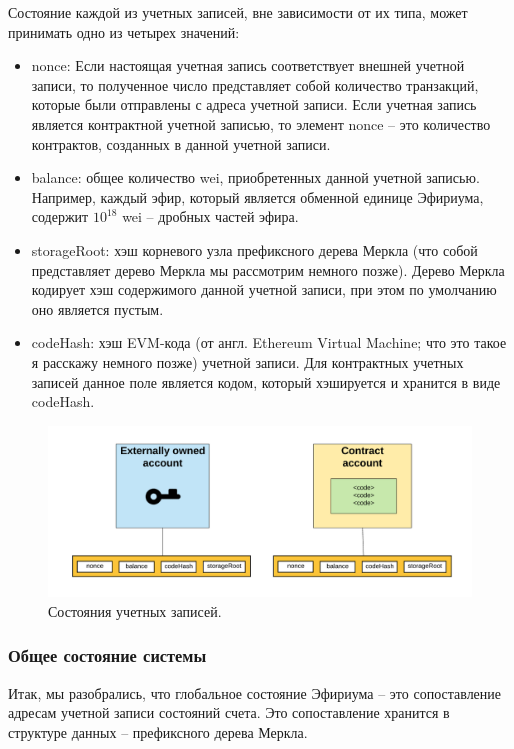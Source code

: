 \documentclass{article}
\begin{document}
Состояние каждой из учетных записей, вне зависимости от их типа, может принимать одно из четырех значений: 

\begin{itemize}
 \item nonce: Если настоящая учетная запись соответствует внешней учетной записи, то полученное число представляет собой количество транзакций, которые были отправлены с адреса учетной записи. Если учетная запись является контрактной учетной записью, то элемент nonce – это количество контрактов, созданных в данной учетной записи.
 \item balance: общее количество wei, приобретенных данной учетной записью. Например, каждый эфир, который является обменной единице Эфириума, содержит $10^{18}$ wei – дробных частей эфира.
 \item storageRoot: хэш корневого узла префиксного дерева Меркла (что собой представляет дерево Меркла мы рассмотрим немного позже). Дерево Меркла кодирует хэш содержимого данной учетной записи, при этом по умолчанию оно является пустым.
 \item codeHash: хэш EVM-кода (от англ. Ethereum Virtual Machine; что это такое я расскажу немного позже) учетной записи. Для контрактных учетных записей данное поле является кодом, который хэшируется и хранится в виде codeHash.
 
\end{itemize}

\begin{figure}
    \centering
    \includegraphics[scale=0.25]{scheme_8}
    \caption{Состояния учетных записей.}
    \label{fig:scheme_8}
\end{figure}


\subsubsection{Общее состояние системы}

Итак, мы разобрались, что глобальное состояние Эфириума – это сопоставление адресам учетной записи состояний счета. Это сопоставление хранится в структуре данных – префиксного дерева Меркла.
\end{document}
